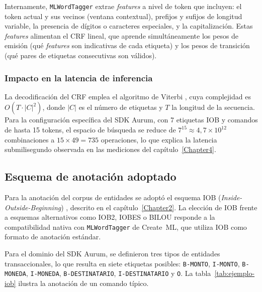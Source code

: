 Internamente, \texttt{MLWord\-Tagger} extrae \textit{features} a nivel de token que incluyen: el token actual y sus vecinos (ventana contextual), prefijos y sufijos de longitud variable, la presencia de dígitos o caracteres especiales, y la capitalización. Estas \textit{features} alimentan el CRF lineal, que aprende simultáneamente los pesos de emisión (qué \textit{features} son indicativas de cada etiqueta) y los pesos de transición (qué pares de etiquetas consecutivas son válidos).

\subsubsection{Impacto en la latencia de inferencia}

La decodificación del CRF emplea el algoritmo de Viterbi \citep{viterbi1967error}, cuya complejidad es $O(T \cdot |C|^2)$, donde $|C|$ es el número de etiquetas y $T$ la longitud de la secuencia. Para la configuración específica del SDK Aurum, con 7 etiquetas IOB y comandos de hasta 15 tokens, el espacio de búsqueda se reduce de $7^{15} \approx 4,7 \times 10^{12}$ combinaciones a $15 \times 49 = 735$ operaciones, lo que explica la latencia submilisegundo observada en las mediciones del capítulo~\ref{Chapter4}.

\subsection{Esquema de anotación adoptado}
\label{subsec:esquema-iob}

Para la anotación del corpus de entidades se adoptó el esquema IOB (\textit{Inside-Outside-Beginning}) \citep{ramshaw1995text}, descrito en el capítulo~\ref{Chapter2}. La elección de IOB frente a esquemas alternativos como IOB2, IOBES o BILOU responde a la compatibilidad nativa con \texttt{MLWord\-Tagger} de Create~ML, que utiliza IOB como formato de anotación estándar.

Para el dominio del SDK Aurum, se definieron tres tipos de entidades transaccionales, lo que resulta en siete etiquetas posibles: \texttt{B-MONTO}, \texttt{I-MONTO}, \texttt{B-MONEDA}, \texttt{I-MONEDA}, \texttt{B-DESTINATARIO}, \texttt{I-DESTINATARIO} y \texttt{O}. La tabla~\ref{tab:ejemplo-iob} ilustra la anotación de un comando típico.

\begin{table}[H]
\caption{Ejemplo de anotación IOB para el comando \texttt{pasale dos lucas a Juan Pérez}.}
\centering
{}
\label{tab:ejemplo-iob}
\end{table}

